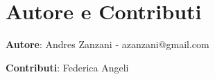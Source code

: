\section{Autore e Contributi}

\textbf{Autore}: Andres Zanzani - azanzani@gmail.com

\medskip

\noindent\textbf{Contributi}: Federica Angeli

